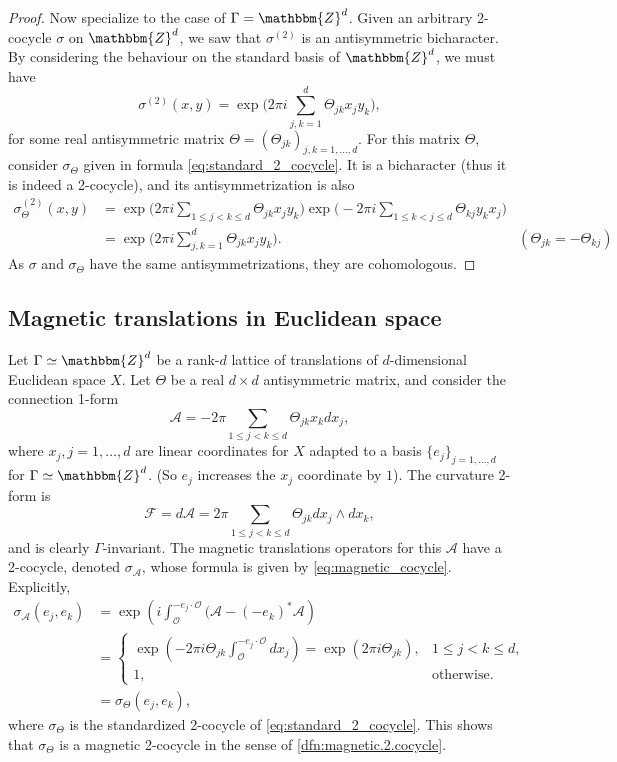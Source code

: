 \documentclass{amsart}
\numberwithin{figure}{section}
\numberwithin{equation}{section}
\numberwithin{table}{section}
\theoremstyle{plain}
\theoremstyle{definition}
\theoremstyle{remark}
\theoremstyle{nonumber}
\newcommand{\Z}{\mathbb{Z}}
\renewcommand{\mathbb}{\mathbbm} %
\begin{document}
\begin{proof}
Now specialize to the case of $\Gamma=\Z^d$. Given an arbitrary 2-cocycle $\sigma$ on $\Z^d$, we saw that $\sigma^{(2)}$ is an antisymmetric bicharacter. By considering the behaviour on the standard basis of $\Z^d$, we must have
\[
\sigma^{(2)}(x,y)=\exp\big(2\pi i \sum_{j,k=1}^d \Theta_{jk}x_jy_k\big),
\]
for some real antisymmetric matrix $\Theta=(\Theta_{jk})_{j,k=1,\ldots,d}$. For this matrix $\Theta$, consider $\sigma_\Theta$ given in formula \eqref{eq:standard_2_cocycle}. It is a bicharacter (thus it is indeed a 2-cocycle), and its antisymmetrization is also
\begin{align*}
\sigma_\Theta^{(2)}(x,y)&=\exp\big(2\pi i \sum_{1\leq j<k\leq d}\Theta_{jk}x_j y_k\big)\exp\big(-2\pi i \sum_{1\leq k<j\leq d}\Theta_{kj}y_k x_j\big)\\
&=\exp\big(2\pi i \sum_{j,k=1}^d\Theta_{jk}x_j y_k\big). & (\Theta_{jk}=-\Theta_{kj})
\end{align*}
As $\sigma$ and $\sigma_\Theta$ have the same antisymmetrizations, they are cohomologous.
\end{proof}


\subsection{Magnetic translations in Euclidean space}\label{sec:Euclidean.magnetic.translations}
Let $\Gamma\simeq \Z^d$ be a rank-$d$ lattice of translations of $d$-dimensional Euclidean space $X$.
Let $\Theta$ be a real $d\times d$ antisymmetric matrix, and consider the connection 1-form
\begin{equation}\label{eq:standard.connection.form}
\mathscr{A}=-2\pi \sum_{1\leq j<k\leq d} \Theta_{jk} x_kdx_j,
\end{equation}
where $x_j, j=1,\ldots,d$ are linear coordinates for $X$ adapted to a basis $\{e_j\}_{j=1,\ldots,d}$ for $\Gamma\simeq\Z^d$. (So $e_j$ increases the $x_j$ coordinate by $1$). The curvature 2-form is
\[
\mathscr{F}=d\mathscr{A}=2\pi \sum_{1\leq j<k\leq d} \Theta_{jk}dx_j\wedge dx_k,
\]
and is clearly $\Gamma$-invariant.
The magnetic translations operators for this $\mathscr{A}$ have a 2-cocycle, denoted $\sigma_\mathscr{A}$, whose formula is given by \eqref{eq:magnetic_cocycle}. Explicitly,
\begin{align*}
\sigma_\mathscr{A}(e_j,e_k)&=\exp\left(i\int_\mathcal{O}^{-e_j\cdot\mathcal{O}}(\mathscr{A}-(-e_k)^*\mathscr{A}\right)\\
&=
\begin{cases}\exp\left(-2\pi i\Theta_{jk}\int_\mathcal{O}^{-e_j\cdot\mathcal{O}} dx_j\right)=\exp(2\pi i\Theta_{jk}), & 1\leq j<k\leq d,\\
1, & \mathrm{otherwise}.
\end{cases}\\
&=\sigma_\Theta(e_j,e_k),
\end{align*}
where $\sigma_\Theta$ is the standardized 2-cocycle of \eqref{eq:standard_2_cocycle}. This shows that $\sigma_\Theta$ is a magnetic 2-cocycle in the sense of \cref{dfn:magnetic.2.cocycle}.
\end{document}
